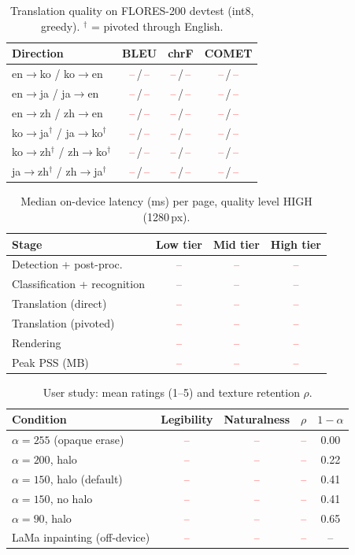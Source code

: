\documentclass[journal]{IEEEtran}
\newcommand{\tbd}[1][--]{\textcolor{red}{#1}}
\newcommand{\tbd}[1][--]{#1}
\theoremstyle{definition}
\begin{document}
\begin{table}[t]
\centering
\caption{Translation quality on FLORES-200 devtest (int8, greedy). $^\dagger$ = pivoted through English.}
\label{tab:mt}
\begin{tabular}{lccc}
\toprule
Direction & BLEU & chrF & COMET\\
\midrule
en$\to$ko / ko$\to$en & \tbd\,/\,\tbd & \tbd\,/\,\tbd & \tbd\,/\,\tbd\\
en$\to$ja / ja$\to$en & \tbd\,/\,\tbd & \tbd\,/\,\tbd & \tbd\,/\,\tbd\\
en$\to$zh / zh$\to$en & \tbd\,/\,\tbd & \tbd\,/\,\tbd & \tbd\,/\,\tbd\\
ko$\to$ja$^\dagger$ / ja$\to$ko$^\dagger$ & \tbd\,/\,\tbd & \tbd\,/\,\tbd & \tbd\,/\,\tbd\\
ko$\to$zh$^\dagger$ / zh$\to$ko$^\dagger$ & \tbd\,/\,\tbd & \tbd\,/\,\tbd & \tbd\,/\,\tbd\\
ja$\to$zh$^\dagger$ / zh$\to$ja$^\dagger$ & \tbd\,/\,\tbd & \tbd\,/\,\tbd & \tbd\,/\,\tbd\\
\bottomrule
\end{tabular}
\end{table}

\begin{table}[t]
\centering
\caption{Median on-device latency (ms) per page, quality level HIGH (1280\,px).}
\label{tab:lat}
\begin{tabular}{lccc}
\toprule
Stage & Low tier & Mid tier & High tier\\
\midrule
Detection + post-proc. & \tbd & \tbd & \tbd\\
Classification + recognition & \tbd & \tbd & \tbd\\
Translation (direct) & \tbd & \tbd & \tbd\\
Translation (pivoted) & \tbd & \tbd & \tbd\\
Rendering & \tbd & \tbd & \tbd\\
\midrule
Peak PSS (MB) & \tbd & \tbd & \tbd\\
\bottomrule
\end{tabular}
\end{table}

\begin{table}[t]
\centering
\caption{User study: mean ratings (1--5) and texture retention $\rho$.}
\label{tab:user}
\begin{tabular}{lcccc}
\toprule
Condition & Legibility & Naturalness & $\rho$ & $1-\alpha$\\
\midrule
$\alpha=255$ (opaque erase)  & \tbd & \tbd & \tbd & 0.00\\
$\alpha=200$, halo           & \tbd & \tbd & \tbd & 0.22\\
$\alpha=150$, halo (default) & \tbd & \tbd & \tbd & 0.41\\
$\alpha=150$, no halo        & \tbd & \tbd & \tbd & 0.41\\
$\alpha=90$, halo            & \tbd & \tbd & \tbd & 0.65\\
LaMa inpainting (off-device) & \tbd & \tbd & \tbd & --\\
\bottomrule
\end{tabular}
\end{table}
\end{document}
